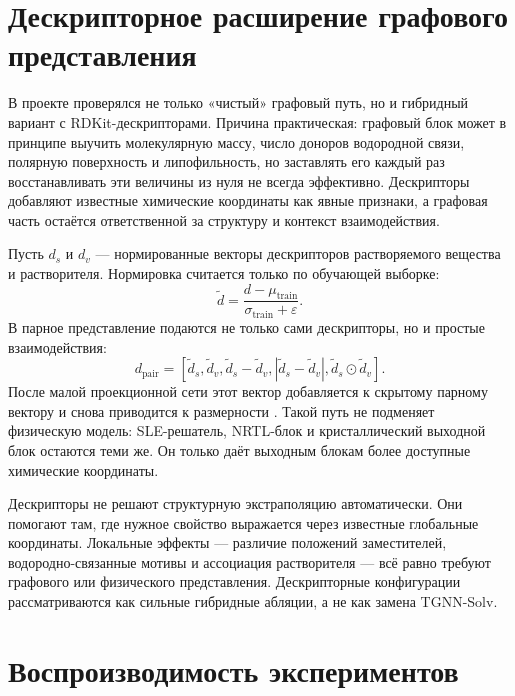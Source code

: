 \documentclass[11pt]{article}
\DeclareRobustCommand{\code}[1]{\texttt{\detokenize{#1}}}
\theoremstyle{definition}
\begin{document}
\section{Дескрипторное расширение графового представления}
\label{app:descriptor-augmentation}

В проекте проверялся не только «чистый» графовый путь, но и гибридный вариант с RDKit-дескрипторами. Причина практическая: графовый блок может в принципе выучить молекулярную массу, число доноров водородной связи, полярную поверхность и липофильность, но заставлять его каждый раз восстанавливать эти величины из нуля не всегда эффективно. Дескрипторы добавляют известные химические координаты как явные признаки, а графовая часть остаётся ответственной за структуру и контекст взаимодействия.

Пусть $d_s$ и $d_v$ --- нормированные векторы дескрипторов растворяемого вещества и растворителя. Нормировка считается только по обучающей выборке:
\begin{equation*}
    \tilde d=\frac{d-\mu_{\mathrm{train}}}{\sigma_{\mathrm{train}}+\varepsilon}.
\end{equation*}
В парное представление подаются не только сами дескрипторы, но и простые взаимодействия:
\begin{equation*}
    d_{\mathrm{pair}}
    =
    [\tilde d_s,\tilde d_v,\tilde d_s-\tilde d_v,
      |\tilde d_s-\tilde d_v|,\tilde d_s\odot \tilde d_v].
\end{equation*}
После малой проекционной сети этот вектор добавляется к скрытому парному вектору и снова приводится к размерности \code{pair\_dim}. Такой путь не подменяет физическую модель: SLE-решатель, NRTL-блок и кристаллический выходной блок остаются теми же. Он только даёт выходным блокам более доступные химические координаты.

Дескрипторы не решают структурную экстраполяцию автоматически. Они помогают там, где нужное свойство выражается через известные глобальные координаты. Локальные эффекты --- различие положений заместителей, водородно-связанные мотивы и ассоциация растворителя --- всё равно требуют графового или физического представления. Дескрипторные конфигурации рассматриваются как сильные гибридные абляции, а не как замена TGNN-Solv.

\section{Воспроизводимость экспериментов}
\label{app:artifact-contract}
\end{document}
